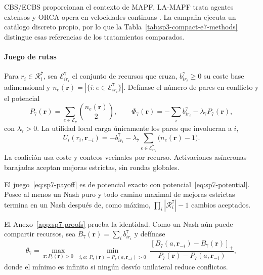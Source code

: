 CBS/ECBS proporcionan el contexto de MAPF, LA-MAPF trata agentes extensos y ORCA opera en velocidades continuas \parencite{sharon2015cbs,barer2014ecbs,li2019largeAgentMapf,vandenberg2011orca}. La campaña ejecuta un catálogo discreto propio, por lo que la Tabla~\ref{tab:sp3-compact-e7-methods} distingue esas referencias de los tratamientos comparados.


\paragraph{Juego de rutas}

Para $r_i\in\mathcal R_i^7$, sea $\mathcal E_{ir_i}^7$ el conjunto de recursos que cruza, $b_{ir_i}^7\geq0$ su coste base adimensional y
$n_e(\boldsymbol r)=|\{i:e\in\mathcal E_{ir_i}^7\}|$. Defínase el número de pares en conflicto y el potencial
\begin{equation}
\label{eq:sp7-potential}
 P_7(\boldsymbol r)=\sum_{e\in\mathcal E_7}\binom{n_e(\boldsymbol r)}{2},
 \qquad
 \Phi_7(\boldsymbol r)=-\sum_i b_{ir_i}^7-\lambda_7P_7(\boldsymbol r),
\end{equation}
con $\lambda_7>0$. La utilidad local carga únicamente los pares que involucran a $i$,
\begin{equation}
\label{eq:sp7-payoff}
 U_i(r_i,\boldsymbol r_{-i})=-b_{ir_i}^7
 -\lambda_7\sum_{e\in\mathcal E_{ir_i}^7}\bigl(n_e(\boldsymbol r)-1\bigr).
\end{equation}
La coalición usa coste y conteos vecinales por recurso. Activaciones asíncronas barajadas aceptan mejoras estrictas, sin rondas globales.

\begin{teorema}
\label{thm:sp7-exact-potential}
El juego~\eqref{eq:sp7-payoff} es de potencial exacto con potencial~\eqref{eq:sp7-potential}. Posee al menos un Nash puro y todo camino maximal de mejoras estrictas termina en un Nash después de, como máximo, $\prod_i|\mathcal R_i^7|-1$ cambios aceptados.
\end{teorema}

El Anexo~\ref{app:sp7-proofs} prueba la identidad. Como un Nash aún puede compartir recursos, sea $B_7(\boldsymbol r)=\sum_i b_{ir_i}^7$ y defínase
\begin{equation}
\label{eq:sp7-threshold}
 \theta_7=\max_{\boldsymbol r:P_7(\boldsymbol r)>0}
 \min_{\substack{i,a:\ P_7(\boldsymbol r)-P_7(a,\boldsymbol r_{-i})>0}}
 \frac{[B_7(a,\boldsymbol r_{-i})-B_7(\boldsymbol r)]_+}
 {P_7(\boldsymbol r)-P_7(a,\boldsymbol r_{-i})},
\end{equation}
donde el mínimo es infinito si ningún desvío unilateral reduce conflictos.

